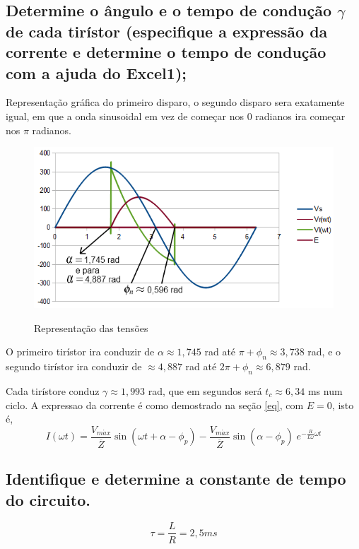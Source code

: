 \documentclass[titlepage, a4paper, 11pt, reqno, openany]{article}%
\begin{document}
\subsection{\textnormal{Determine o \^{a}ngulo e o tempo de condu\c{c}\~{a}o $\gamma$ de cada tir\'{i}stor (especifique a express\~{a}o da corrente e determine o tempo de condu\c{c}\~{a}o com a ajuda do {\bf Excel1});}}
%
Representa\c{c}\~{a}o gr\'{a}fica do primeiro disparo, o segundo disparo sera exatamente igual, em que a onda sinusoidal em vez de come\c{c}ar nos $0$ radianos ira come\c{c}ar nos $\pi$ radianos.
\begin{figure}[H]
\centering
\includegraphics[width=0.75\linewidth]{./image/P3A1_1_3.png}\\
\caption{Representa\c{c}\~{a}o das tens\~{o}es}
\label{grafico 1}
\end{figure}\par
%
O primeiro tir\'{i}stor ira conduzir de $\alpha \approx 1,745$ rad at\'{e} $\pi + \phi_n  \approx 3,738$ rad, e o segundo tir\'{i}stor ira conduzir de $\approx 4,887$ rad at\'{e} $2\pi + \phi_n \approx 6,879$ rad.\par
Cada tir\'{i}store conduz $\gamma \approx 1,993$ rad, que em segundos ser\'{a} $t_c \approx 6,34$ ms num ciclo.
A expressao da corrente \'e como demostrado na se\c{c}\~{a}o \ref{eq}, com $E=0$, isto \'{e},
\begin{equation}
I(\omega t) = \frac{V_{m\acute{a}x}}{\overline{Z}} \sin(\omega t + \alpha - \phi_p) - \frac{V_{m\acute{a}x}}{\overline{Z}} \sin(\alpha - \phi_p) \; e^{-\frac{R}{L \omega}\omega t}
\end{equation}
\subsection{\textnormal{Identifique e determine a constante de tempo do circuito.}}
\begin{equation}
\tau = \frac{L}{R} = 2,5 ms 
\end{equation}
\end{document}
